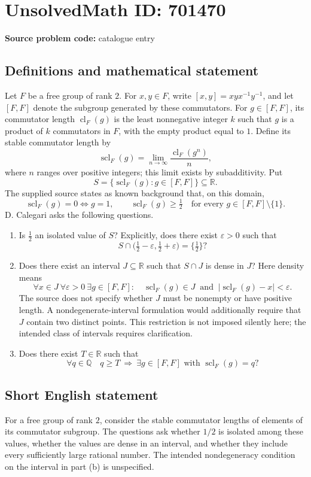 \documentclass[11pt]{article}
\newcommand{\Q}{\mathbb{Q}}
\newcommand{\R}{\mathbb{R}}
\begin{document}
\section*{UnsolvedMath ID: 701470}
\textbf{Source problem code:} catalogue entry
\subsection{Definitions and mathematical statement}
Let \(F\) be a free group of rank \(2\). For \(x,y\in F\), write \([x,y]=xyx^{-1}y^{-1}\), and let \([F,F]\) denote the subgroup generated by these commutators. For \(g\in[F,F]\), its commutator length \(\operatorname{cl}_F(g)\) is the least nonnegative integer \(k\) such that \(g\) is a product of \(k\) commutators in \(F\), with the empty product equal to \(1\). Define its stable commutator length by
\[
\operatorname{scl}_F(g)=\lim_{n\to\infty}\frac{\operatorname{cl}_F(g^n)}{n},
\]
where \(n\) ranges over positive integers; this limit exists by subadditivity. Put
\[
S=\{\operatorname{scl}_F(g):g\in[F,F]\}\subseteq\R.
\]
The supplied source states as known background that, on this domain,
\[
\operatorname{scl}_F(g)=0\iff g=1,
\qquad
\operatorname{scl}_F(g)\ge\tfrac12\quad\text{for every }g\in[F,F]\setminus\{1\}.
\]
D. Calegari asks the following questions.
\begin{enumerate}
\item[(a)] Is \(\tfrac12\) an isolated value of \(S\)? Explicitly, does there exist \(\varepsilon>0\) such that
\[
S\cap\bigl(\tfrac12-\varepsilon,\tfrac12+\varepsilon\bigr)=\{\tfrac12\}?
\]
\item[(b)] Does there exist an interval \(J\subseteq\R\) such that \(S\cap J\) is dense in \(J\)? Here density means
\[
\forall x\in J\ \forall\varepsilon>0\ \exists g\in[F,F]:\quad
\operatorname{scl}_F(g)\in J\ \text{ and }\ 
\bigl|\operatorname{scl}_F(g)-x\bigr|<\varepsilon.
\]
The source does not specify whether \(J\) must be nonempty or have positive length. A nondegenerate-interval formulation would additionally require that \(J\) contain two distinct points. This restriction is not imposed silently here; the intended class of intervals requires clarification.
\item[(c)] Does there exist \(T\in\R\) such that
\[
\forall q\in\Q\quad
q\ge T\ \Longrightarrow\ \exists g\in[F,F]\text{ with }\operatorname{scl}_F(g)=q?
\]
\end{enumerate}
\subsection{Short English statement}
For a free group of rank \(2\), consider the stable commutator lengths of elements of its commutator subgroup. The questions ask whether \(1/2\) is isolated among these values, whether the values are dense in an interval, and whether they include every sufficiently large rational number. The intended nondegeneracy condition on the interval in part (b) is unspecified.
\end{document}
